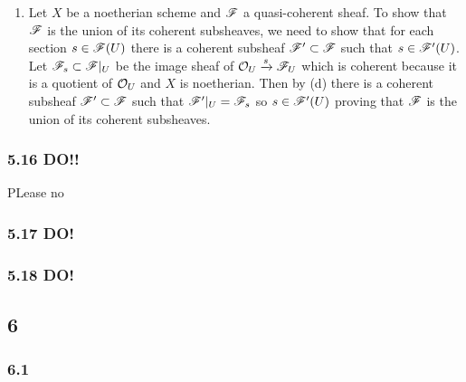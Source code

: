 \documentclass[12pt]{article}
\begin{document}
\begin{enumerate}
\item Let $X$ be a noetherian scheme and $\mathscr{F}$ a quasi-coherent sheaf. To show that $\mathscr{F}$ is the union of its coherent subsheaves, we need to show that for each section $s \in \mathscr{F}(U)$ there is a coherent subsheaf $\mathscr{F}' \subset \mathscr{F}$ such that $s \in \mathscr{F}'(U)$. Let $\mathscr{F}_s \subset \mathscr{F}|_U$ be the image sheaf of $\mathcal{O}_{U} \xrightarrow{s} \mathscr{F}_U$ which is coherent because it is a quotient of $\mathcal{O}_{U}$ and $X$ is noetherian. Then by (d) there is a coherent subsheaf $\mathscr{F}' \subset \mathscr{F}$ such that $\mathscr{F}'|_U = \mathscr{F}_s$ so $s \in \mathscr{F}'(U)$ proving that $\mathscr{F}$ is the union of its coherent subsheaves.
\end{enumerate}

\subsubsection{5.16 DO!!}

PLease no

\subsubsection{5.17 DO!}

\subsubsection{5.18 DO!}

\subsection{6}

\subsubsection{6.1}
\end{document}
